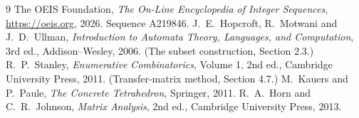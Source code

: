 \documentclass[11pt,a4paper]{article}
\theoremstyle{plain}
\theoremstyle{definition}
\begin{document}
\begin{thebibliography}{9}
 The OEIS Foundation, \emph{The On-Line Encyclopedia of Integer
Sequences}, \url{https://oeis.org}, 2026. Sequence A219846.
 J.~E.~Hopcroft, R.~Motwani and J.~D.~Ullman, \emph{Introduction to Automata
Theory, Languages, and Computation}, 3rd ed., Addison--Wesley, 2006. (The subset
construction, Section 2.3.)
 R.~P.~Stanley, \emph{Enumerative Combinatorics}, Volume 1, 2nd ed.,
Cambridge University Press, 2011. (Transfer-matrix method, Section 4.7.)
 M.~Kauers and P.~Paule, \emph{The Concrete Tetrahedron}, Springer, 2011.
 R.~A.~Horn and C.~R.~Johnson, \emph{Matrix Analysis}, 2nd ed., Cambridge
University Press, 2013.
\end{thebibliography}
\end{document}
